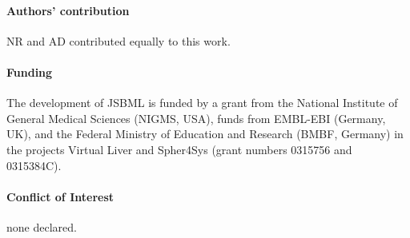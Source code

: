 \documentclass{bioinfo}
\begin{document}
\paragraph{Authors' contribution\textcolon} NR and AD contributed equally to
this work.

\paragraph{Funding\textcolon}
The development of JSBML is funded by a grant from the National Institute of
General Medical Sciences (NIGMS, USA), funds from EMBL-EBI (Germany, UK), and
the Federal Ministry of Education and Research (BMBF, Germany) in the projects
Virtual Liver and Spher4Sys (grant numbers 0315756 and 0315384C).

\paragraph{Conflict of Interest\textcolon} none declared.

%
%
%
%
%
%
%
%
%


% 
% 
\end{document}
